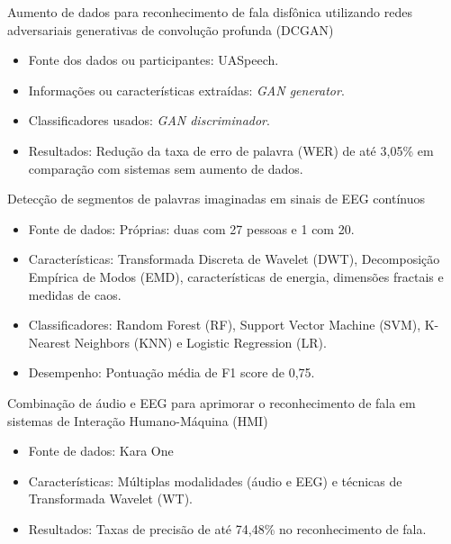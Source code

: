 \documentclass[aspectratio=169]{beamer}
\begin{document}
	
	\begin{frame}{Aumento de dados para reconhecimento de fala disfônica utilizando redes adversariais generativas de convolução profunda (DCGAN) \cite{jin21_interspeech}}
		\begin{itemize}
			\item Fonte dos dados ou participantes: UASpeech.
			\item Informações ou características extraídas: \textit{GAN generator}.
			\item Classificadores usados: \textit{GAN discriminador}.
			\item Resultados: Redução da taxa de erro de palavra (WER) de até 3,05\% em comparação com sistemas sem aumento de dados.
		\end{itemize}
		
	\end{frame}


	\begin{frame}{Detecção de segmentos de palavras imaginadas em sinais de EEG contínuos \cite{WOS:000614122200021}}
		\begin{itemize}
			\item Fonte de dados: Próprias: duas com 27 pessoas e 1 com 20.
			\item Características: Transformada Discreta de Wavelet (DWT), Decomposição Empírica de Modos (EMD), características de energia, dimensões fractais e medidas de caos.
			\item Classificadores: Random Forest (RF), Support Vector Machine (SVM), K-Nearest Neighbors (KNN) e Logistic Regression (LR).
			\item Desempenho: Pontuação média de F1 score de 0,75.
		\end{itemize}
		
	\end{frame}

	\begin{frame}{Combinação de áudio e EEG para aprimorar o reconhecimento de fala em sistemas de Interação Humano-Máquina (HMI) \cite{WOS:000591530700001}}
		\begin{itemize}
			\item Fonte de dados: Kara One \cite{zhao2015classifying}
			\item Características: Múltiplas modalidades (áudio e EEG) e técnicas de Transformada Wavelet (WT).
			\item Resultados: Taxas de precisão de até 74,48\% no reconhecimento de fala.
		\end{itemize}
		
	\end{frame}
		
\end{document}
